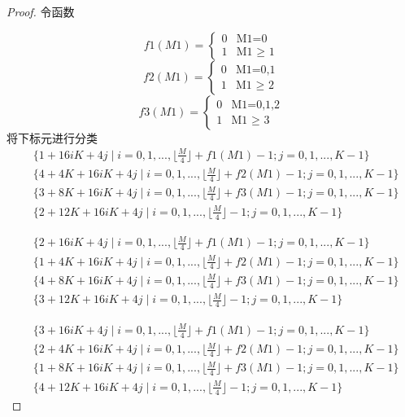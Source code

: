 \documentclass[twoside,a4paper,CCT]{cctart}   %
\begin{document}
\begin{proof}
令函数

$$f1(M1)=
\begin{cases}
0& \text{M1=0}\\
1& \text{M1 $\geq$ 1}
\end{cases}$$
$$f2(M1)=
\begin{cases}
0& \text{M1=0,1}\\
1& \text{M1 $\geq$ 2}
\end{cases}$$
$$f3(M1)=
\begin{cases}
0& \text{M1=0,1,2}\\
1& \text{M1 $\geq$ 3}
\end{cases}$$
将下标元进行分类
\begin{equation}\label{2}
\begin{split}
&
\{1+16iK+4j \mid
i=0,1,...,\lfloor \frac{M}{4} \rfloor + f1(M1) -1;
j=0,1,...,K-1\} \\
& \{4+4K+16iK+4j \mid
i=0,1,...,\lfloor \frac{M}{4} \rfloor + f2(M1) -1;
j=0,1,...,K-1\} \\
&
\{3+8K+16iK+4j \mid
i=0,1,...,\lfloor \frac{M}{4} \rfloor + f3(M1) -1;
j=0,1,...,K-1\} \\
&\{2+12K+16iK+4j \mid
i=0,1,...,\lfloor \frac{M}{4} \rfloor -1;
j=0,1,...,K-1\}
\end{split}
\end{equation}

\begin{equation}\label{3}
\begin{split}
&
\{2+16iK+4j \mid
i=0,1,...,\lfloor \frac{M}{4} \rfloor + f1(M1) -1;
j=0,1,...,K-1\} \\
& \{1+4K+16iK+4j \mid
i=0,1,...,\lfloor \frac{M}{4} \rfloor + f2(M1) -1;
j=0,1,...,K-1\} \\
&
\{4+8K+16iK+4j \mid
i=0,1,...,\lfloor \frac{M}{4} \rfloor + f3(M1) -1;
j=0,1,...,K-1\} \\
&\{3+12K+16iK+4j \mid
i=0,1,...,\lfloor \frac{M}{4} \rfloor -1;
j=0,1,...,K-1\}
\end{split}
\end{equation}

\begin{equation}\label{4}
\begin{split}
&
\{3+16iK+4j \mid
i=0,1,...,\lfloor \frac{M}{4} \rfloor + f1(M1) -1;
j=0,1,...,K-1\} \\
& \{2+4K+16iK+4j \mid
i=0,1,...,\lfloor \frac{M}{4} \rfloor + f2(M1) -1;
j=0,1,...,K-1\} \\
&
\{1+8K+16iK+4j \mid
i=0,1,...,\lfloor \frac{M}{4} \rfloor + f3(M1) -1;
j=0,1,...,K-1\} \\
&\{4+12K+16iK+4j \mid
i=0,1,...,\lfloor \frac{M}{4} \rfloor -1;
j=0,1,...,K-1\}
\end{split}
\end{equation}


\end{proof}
\end{document}
